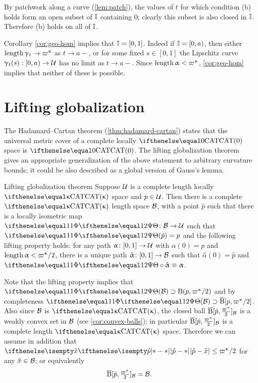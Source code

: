 By patchwork along a curve (\ref{lem:patch}), the values of $t$ for which condition (b)  holds form an open subset of $\mathbb{I}$ containing $0$; clearly this subset is also closed in $\mathbb{I}$.
Therefore (b) holds on all of $\mathbb{I}$. 
 
Corollary \ref{cor:geo-hom} implies that
$\mathbb{I}=[0,1]$.
Indeed if $\mathbb{I}=[0,a)$, then either $\length\gamma_t\to\varpi\kappa$ as $t\to a-$,
or for some fixed $s\in [0,1]$ the Lipschitz curve $\gamma_t(s):[0,a)\to\spc{U}$ has no limit as $t\to a-$.
Since $\length\alpha<\varpi\kappa$, \ref{cor:geo-hom} implies that neither of these is possible.
\qeds




\section{Lifting globalization}\label{sec:cat-globalize}

The Hadamard--Cartan theorem (\ref{thm:hadamard-cartan}) states that 
the universal metric cover of a complete locally $\CAT0$ space is $\CAT0$.
The lifting globalization theorem gives an appropriate generalization of the above statement to arbitrary curvature bounds;
it could be also described as a global version of Gauss's lemma.



\begin{thm}{Lifting globalization theorem}
\label{thm:globalization-lift}
Suppose $\mathcal{U}$ is a complete length locally $\CAT\kappa$ space and  $p\in\spc{U}$.
Then there is a complete $\CAT\kappa$ length space $\mathcal{B}$, 
with a point $\hat p$ such that 
there is a locally isometric map $\map\:\spc{B}\to\spc{U}$
such that $\map(\hat p)=p$ and the following lifting property holds: 
for any path $\alpha\:[0,1]\to\spc{U}$ with $\alpha(0)=p$ and $\length\alpha<\varpi\kappa/2$, 
there is a unique path $\hat\alpha \:[0,1]\to \spc{B}$ such that $\hat\alpha(0)=\hat p$ 
and $\map\circ\hat\alpha\equiv\alpha$.
\end{thm}


Note that the lifting property implies that $\map(\spc{B})\supset\oBall(p,\varpi\kappa/2)$ and by completeness $\map(\spc{B})\supset\cBall[p,\varpi\kappa/2]$.
Also since $\mathcal{B}$ is $\CAT\kappa$, the closed ball $\cBall[\hat p,\tfrac{\varpi\kappa}2]_{\spc{B}}$ is a weakly convex set in $\mathcal{B}$ (see \ref{cor:convex-balls});
in particular $\cBall[\hat p,\tfrac{\varpi\kappa}2]_{\spc{B}}$ is a complete length $\CAT\kappa$ space.
Therefore we can assume in addition that $\dist{\hat p}{\hat x}{}\le \varpi\kappa/2$ for any $\hat x\in\spc{B}$;
or equivalently
\[\cBall[\hat p,\tfrac{\varpi\kappa}2]_{\spc{B}}=\spc{B}.\]


